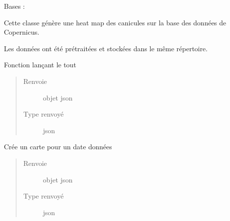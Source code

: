 \documentclass[letterpaper,10pt,french]{sphinxmanual}
\begin{document}
\begin{fulllineitems}
\label{\detokenize{app.home.content_gen:app.home.content_gen.map_generation.CaniculePlot}}
\sphinxAtStartPar
Bases : 

\sphinxAtStartPar
Cette classe génère une heat map des canicules sur la base des données de Copernicus.

\sphinxAtStartPar
Les données ont été pré\sphinxhyphen{}traitées et stockées dans le même répertoire.

\begin{fulllineitems}
\label{\detokenize{app.home.content_gen:app.home.content_gen.map_generation.CaniculePlot.main}}
\sphinxAtStartPar
Fonction lançant le tout
\begin{quote}\begin{description}
\item[{Renvoie}] \leavevmode
\sphinxAtStartPar
objet json

\item[{Type renvoyé}] \leavevmode
\sphinxAtStartPar
json

\end{description}\end{quote}

\end{fulllineitems}


\begin{fulllineitems}
\label{\detokenize{app.home.content_gen:app.home.content_gen.map_generation.CaniculePlot.plot_at_date}}
\sphinxAtStartPar
Crée un carte pour un date données
\begin{quote}\begin{description}
\item[{Renvoie}] \leavevmode
\sphinxAtStartPar
objet json

\item[{Type renvoyé}] \leavevmode
\sphinxAtStartPar
json


\end{description}
\end{quote}
\end{fulllineitems}
\end{fulllineitems}
\end{document}
